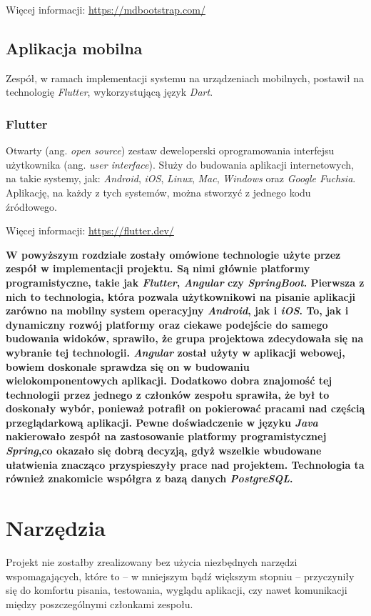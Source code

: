 \documentclass[twoside]{projektInzynierskiMS}
\numberwithin{figure}{section}
\begin{document}
Więcej informacji: \url{https://mdbootstrap.com/}
\subsection{Aplikacja mobilna}
Zespół, w ramach implementacji systemu na urządzeniach mobilnych, postawił na technologię \textit{Flutter}, wykorzystującą język \textit{Dart}.

\subsubsection{Flutter}
Otwarty (ang. \textit{open source}) zestaw deweloperski oprogramowania interfejsu użytkownika (ang. \textit{user interface}). Służy do budowania aplikacji internetowych, na takie systemy, jak: \textit{Android}, \textit{iOS}, \textit{Linux}, \textit{Mac}, \textit{Windows} oraz \textit{Google Fuchsia}. Aplikację, na każdy z tych systemów, można stworzyć z jednego kodu źródłowego.

Więcej informacji: \url{https://flutter.dev/}
\newline

\textbf{W powyższym rozdziale zostały omówione technologie użyte przez zespół w implementacji projektu. Są nimi głównie platformy programistyczne, takie jak \textit{Flutter}, \textit{Angular} czy \textit{SpringBoot}. Pierwsza z nich to technologia, która pozwala użytkownikowi na pisanie aplikacji zarówno na mobilny system operacyjny \textit{Android}, jak i \textit{iOS}. To, jak i dynamiczny rozwój platformy oraz ciekawe podejście do samego budowania widoków, sprawiło, że grupa projektowa zdecydowała się na wybranie tej technologii. \textit{Angular} został użyty w aplikacji webowej, bowiem doskonale sprawdza się on w budowaniu wielokomponentowych aplikacji. Dodatkowo dobra znajomość tej technologii przez jednego z członków zespołu sprawiła, że był to doskonały wybór, ponieważ potrafił on pokierować pracami nad częścią przeglądarkową aplikacji. Pewne doświadczenie w języku \textit{Java} nakierowało zespół na zastosowanie platformy programistycznej \textit{Spring},\linebreak co okazało się dobrą decyzją, gdyż wszelkie wbudowane ułatwienia znacząco przyspieszyły prace nad projektem. Technologia ta również znakomicie współgra z bazą danych \textit{PostgreSQL}.}

\section{Narzędzia}
Projekt nie zostałby zrealizowany bez użycia niezbędnych narzędzi wspomagających, które to -- w mniejszym bądź większym stopniu -- przyczyniły się do komfortu pisania, testowania, wyglądu aplikacji, czy nawet komunikacji między poszczególnymi członkami zespołu.
\end{document}

